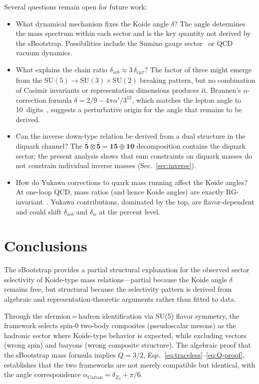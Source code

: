 \documentclass[prd,twocolumn,superscriptaddress,nofootinbib]{revtex4-2}
\begin{document}
Several questions remain open for future work:
\begin{itemize}
\item What dynamical mechanism fixes the Koide angle $\delta$?  The
  angle determines the mass spectrum within each sector and is the key
  quantity not derived by the sBootstrap.  Possibilities include
  the Sumino gauge sector~\cite{Sumino2009} or QCD vacuum dynamics.
\item What explains the chain ratio $\delta_{scb}\approx
  3\,\delta_{e\mu\tau}$?  The factor of three might emerge from the
  $\text{SU}(5)\to\text{SU}(3)\times\text{SU}(2)$ breaking pattern,
  but no combination of Casimir invariants or representation dimensions
  produces it.  Brannen's $\alpha$-correction formula
  $\delta=2/9-4\pi\alpha'/3^{12}$, which matches the lepton angle
  to 10~digits~\cite{Brannen2006}, suggests a perturbative origin
  for the angle that remains to be derived.
\item Can the inverse down-type relation be derived from a dual structure
  in the diquark channel?  The
  $\bar{\mathbf{5}}\otimes\bar{\mathbf{5}}=\mathbf{15}\oplus\mathbf{10}$
  decomposition contains the diquark sector; the present analysis shows
  that sum constraints on diquark masses do not constrain individual
  inverse masses (Sec.~\ref{sec:inverse}).
\item How do Yukawa corrections to quark mass running affect the
  Koide angles?  At one-loop QCD, mass ratios (and hence Koide angles)
  are exactly RG-invariant~\cite{EspositoSantorelli1995,XingZhang2006}.
  Yukawa contributions, dominated by the top, are flavor-dependent and
  could shift $\delta_{scb}$ and $\delta_w$ at the percent level.
\end{itemize}

\section{Conclusions}
\label{sec:conclusions}

The sBootstrap provides a partial structural explanation for the observed
sector selectivity of Koide-type mass relations---partial because the
Koide angle $\delta$ remains free, but structural because the selectivity
pattern is derived from algebraic and representation-theoretic arguments
rather than fitted to data.

Through the sfermion\,=\,hadron identification via SU(5) flavor
symmetry, the framework selects spin-0 two-body composites (pseudoscalar
mesons) as the hadronic sector where Koide-type behavior is expected,
while excluding vectors (wrong spin) and baryons (wrong composite
structure).  The algebraic proof that the sBootstrap mass formula implies
$Q=3/2$, Eqs.~\eqref{eq:traceless}--\eqref{eq:Q-proof}, establishes
that the two frameworks are not merely compatible but identical, with the
angle correspondence $\alpha_{\text{Cartan}}=\delta_{Z_3}+\pi/6$.
\end{document}
